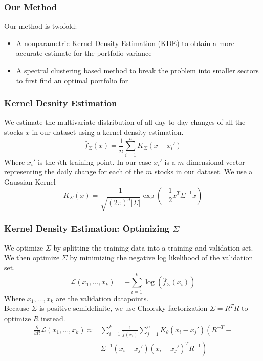 \documentclass{beamer}
\begin{document}
\begin{frame}
    \frametitle{Our Method}
    Our method is twofold:
    \begin{itemize}
        \item A nonparametric Kernel Density Estimation (KDE) to obtain a more accurate estimate for the portfolio variance
        \item A spectral clustering based method to break the problem into smaller sectors to first find an optimal portfolio for
    \end{itemize}
\end{frame}
\begin{frame}
    \frametitle{Kernel Desnity Estimation}
    We estimate the multivariate distribution of all day to day changes of all the stocks $x$ in our dataset using a kernel density estimation.
    \begin{equation}
        \hat{f}_{\Sigma}(x) = \frac{1}{n} \sum_{i=1}^n K_{\Sigma}(x-x_i')
    \end{equation}
    Where $x_i'$ is the $i$th training point. 
    In our case $x_i'$ is a $m$ dimensional vector representing the daily change for each of the $m$ stocks in our dataset. We use 
    a Gaussian Kernel 
    \begin{equation}
        K_{\Sigma}(x) = \frac{1}{\sqrt{(2\pi)^d|\Sigma|}}\exp\left(-\frac{1}{2}x^T\Sigma^{-1}x\right)
    \end{equation}
\end{frame}
\begin{frame}
    \frametitle{Kernel Density Estimation: Optimizing $\Sigma$}
    We optimize $\Sigma$ by splitting the training data into a training and validation set.
     We then optimize $\Sigma$ by minimizing the negative log likelihood of the validation set.
    \begin{equation}
        \mathcal{L}(x_1,\dots,x_k) = -\sum_{i=1}^k \log(\hat{f}_{\Sigma}(x_i))
    \end{equation}
    Where $x_1,\dots,x_k$ are the validation datapoints.\\
    Because $\Sigma$ is positive semidefinite, we use Cholesky factorization $\Sigma = R^TR$ to optimize $R$ instead.
    \begin{align*}
        \frac{\partial}{\partial R}\mathcal{L}(x_1,\dots,x_k) \approx &\sum_{i=1}^k \frac{1}{\hat{f}(x_i)} \sum_{j=1}^n K_{\theta}(x_i-x_j')\left(R^{-T} - \right.\\
        &\left.\Sigma^{-1}(x_i-x_j')(x_i-x_j')^T R^{-1}\right)
    \end{align*}
\end{frame}
\end{document}
